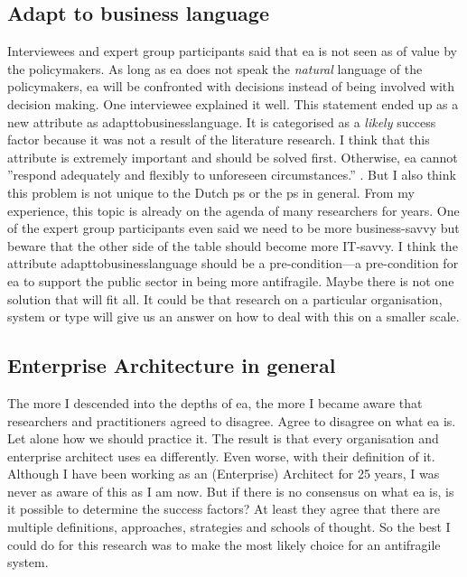 \subsection{Adapt to business language}
\label{sub:adapttobusinesslanguage}
Interviewees and expert group participants said that \acrlong{ea} is not seen as of value by the policymakers. As long as \acrlong{ea} does not speak the \textit{natural} language of the policymakers, \acrlong{ea} will be confronted with decisions instead of being involved with decision making. One interviewee explained it well. This statement ended up as a new \gls{attribute} as \gls{adapttobusinesslanguage}. It is categorised as a \textit{likely} success factor because it was not a result of the literature research. I think that this \gls{attribute} is extremely important and should be solved first. Otherwise, \acrlong{ea} cannot ''respond adequately and flexibly to unforeseen circumstances.'' \parencite{Secretarissen-generaal2018}. But I also think this problem is not unique to the Dutch \gls{ps} or the \gls{ps} in general. From my experience, this topic is already on the agenda of many researchers for years. One of the expert group participants even said we need to be more business-savvy but beware that the other side of the table should become more IT-savvy. I think the \gls{attribute} \gls{adapttobusinesslanguage} should be a pre-condition—a pre-condition for \acrlong{ea} to support the public sector in being more \gls{antifragile}. Maybe there is not one solution that will fit all. It could be that research on a particular organisation, system or type will give us an answer on how to deal with this on a smaller scale.

\subsection{Enterprise Architecture in general}
\label{sub:eainthepublicsector}
The more I descended into the depths of \acrlong{ea}, the more I became aware that researchers and practitioners agreed to disagree. Agree to disagree on what \acrlong{ea} is. Let alone how we should practice it. The result is that every organisation and enterprise architect uses \acrlong{ea} differently. Even worse, with their definition of it. Although I have been working as an (Enterprise) Architect for 25 years, I was never as aware of this as I am now. But if there is no consensus on what \acrlong{ea} is, is it possible to determine the success factors? At least they agree that there are multiple definitions, approaches, strategies and schools of thought. So the best I could do for this research was to make the most likely choice for an \gls{antifragile} system.

